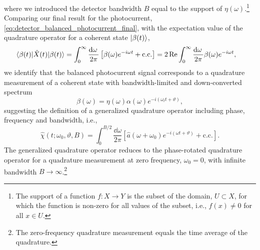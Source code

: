 where we introduced the detector bandwidth $B$ equal to the support of $\eta(\omega)$.\footnote{The support of a function $f\colon X\to Y$ is the subset of the domain, $U\subset X$, for which the function is non-zero for all values of the subset, i.e., $f(x)\neq 0$ for all $x\in U$.}
Comparing our final result for the photocurrent, \cref{eq:detector_balanced_photocurrent_final}, with the expectation value of the quadrature operator for a coherent state $\lvert\beta(t)\rangle$,
\begin{equation}
	\begin{split}
		\bra{\beta(t)}
		\hat{X}(t)
		\ket{\beta(t)}
		&=
		\int_0^\infty
		\frac{\dd{\omega}}{2\pi}
		\left[
			\beta(\omega)
			e^{-i\omega t}
			+
			\text{c.c.}
		\right]
		=
		2\Re
		\int_0^\infty
		\frac{\dd{\omega}}{2\pi}
		\beta(\omega)
		e^{-i\omega t}
		,
	\end{split}
\end{equation}
we identify that the balanced photocurrent signal corresponds to a quadrature measurement of a coherent state with bandwidth-limited and down-converted spectrum
\begin{equation}
	\beta(\omega)
	=
	\eta(\omega)
	\alpha(\omega)
	e^{-i(\omega_lt+\vartheta)}
	,
\end{equation}
suggesting the definition of a generalized quadrature operator including phase, frequency and bandwidth, i.e.,
\begin{equation}
	\hat{\chi}(t;\omega_0,\vartheta,B)
	=
	\int_0^{B/2}\frac{\dd{\omega}}{2\pi}
	\left[
		\hat{a}(\omega+\omega_0)
		e^{-i(\omega t+\vartheta)}
		+
		\text{c.c.}
	\right]
	.
	\label{eq:quadrature_operator_generalized}
\end{equation}
The generalized quadrature operator reduces to the phase-rotated quadrature operator for a quadrature measurement at zero frequency, $\omega_0=0$, with infinite bandwidth $B\to\infty$.\footnote{The zero-frequency quadrature measurement equals the time average of the quadrature.}